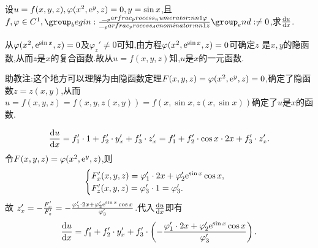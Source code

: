 \begin{example}
    设$u = f(x,y,z), \varphi(x^2,\mathrm{e}^y,z)=0, y = \sin x$,且$f,\varphi \in C^1, \parfrac{\varphi}{z} \neq 0$,求$\frac{\operatorname{d\!} u}{\operatorname{d\!} x}$.
\end{example}

\begin{solution}
    从$\varphi(x^2, \mathrm{e}^{\sin x},z) = 0$及$\varphi_z' \neq 0$可知,由方程$\varphi(x^2, \mathrm{e}^{\sin x},z) = 0$可确定$z $ 是$x,y$的隐函数,从而$z$是$x$的复合函数.故从$u = f(x,y,z)$知,$u$是$x$的一元函数.

    \begin{remark}
        助教注:这个地方可以理解为由隐函数定理$F(x,y,z) = \varphi(x^2, \mathrm{e}^y, z)=0$,确定了隐函数$z = z(x,y)$,从而$u =f(x,y,z) = f(x,y,z(x,y))=f(x,\sin x, z(x,\sin x))$确定了$u$是$x$的函数.
    \end{remark}
    $$
    \frac{\operatorname{d\!} u}{\operatorname{d\!} x} = f_1' \cdot 1 + f_2' \cdot y_x' + f_3' \cdot z_x' = f_1' + f_2' \cdot \cos x \cdot 2x + f_3' \cdot z_x'.
    $$
    令$F(x,y,z) = \varphi(x^2, \mathrm{e}^y, z)$,则
    $$
    \begin{cases}
        F_x'(x,y,z) = \varphi_1' \cdot 2x + \varphi_2' \mathrm{e}^{\sin x} \cos x,\\
        F_z'(x,y,z) = \varphi_3' \cdot 1 = \varphi_3'.
    \end{cases}
    $$
    故
    $z_x' = - \frac{F_x'}{F_z'} = - \frac{\varphi_1' \cdot 2x + \varphi_2' \mathrm{e}^{\sin x} \cos x}{\varphi_3'}$.代入$\frac{\operatorname{d\!} u}{\operatorname{d\!} x}$即有
    $$
    \frac{\operatorname{d\!} u}{\operatorname{d\!} x} = f_1' + f_2' \cdot y_x' + f_3' \cdot \left( - \frac{\varphi_1' \cdot 2x + \varphi_2' \mathrm{e}^{\sin x} \cos x}{\varphi_3'} \right).
    $$


\end{solution}
